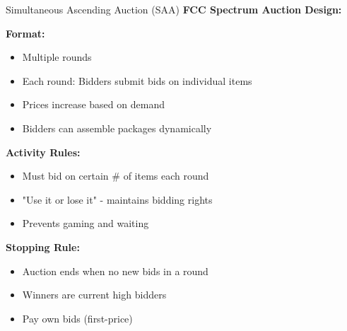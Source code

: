 \documentclass[xcolor={x11names}, aspectratio=169 ]{beamer}
\begin{document}
\begin{frame}{Simultaneous Ascending Auction (SAA)}
\textbf{FCC Spectrum Auction Design:}

\textbf{Format:}
\begin{itemize}
  \item Multiple rounds
  \item Each round: Bidders submit bids on individual items
  \item Prices increase based on demand
  \item Bidders can assemble packages dynamically
\end{itemize}

\textbf{Activity Rules:}
\begin{itemize}
  \item Must bid on certain \# of items each round
  \item "Use it or lose it" - maintains bidding rights
  \item Prevents gaming and waiting
\end{itemize}

\textbf{Stopping Rule:}
\begin{itemize}
  \item Auction ends when no new bids in a round
  \item Winners are current high bidders
  \item Pay own bids (first-price)
\end{itemize}
\end{frame}
\end{document}
